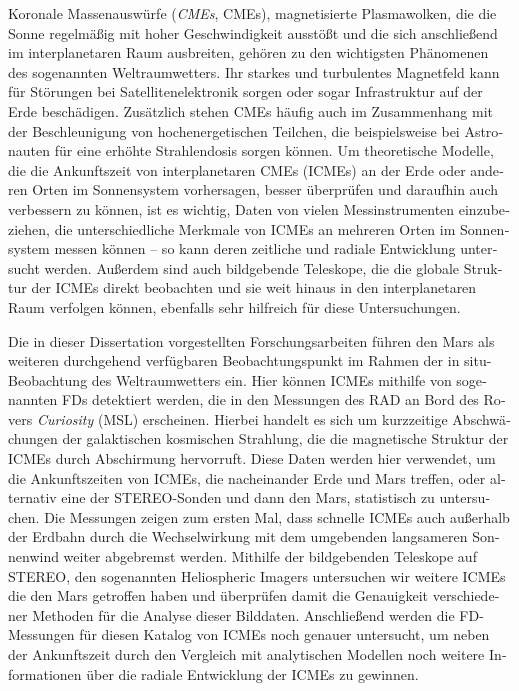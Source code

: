 \begin{otherlanguage}{ngerman}
Koronale Massenauswürfe (\textit{\aclp{CME}}, \acp{CME}), magnetisierte Plasmawolken, die die Sonne regelmäßig mit hoher Geschwindigkeit ausstößt und die sich anschließend im interplanetaren Raum ausbreiten, gehören zu den wichtigsten Phänomenen des sogenannten Weltraumwetters.
Ihr starkes und turbulentes Magnetfeld kann für Störungen bei Satellitenelektronik sorgen oder sogar Infrastruktur auf der Erde beschädigen. Zusätzlich stehen \acp{CME} häufig auch im Zusammenhang mit der Beschleunigung von hochenergetischen Teilchen, die beispielsweise bei Astronauten für eine erhöhte Strahlendosis sorgen können.
Um theoretische Modelle, die die Ankunftszeit von interplanetaren \acp{CME} (\acsp{ICME}) an der Erde oder anderen Orten im Sonnensystem vorhersagen, besser überprüfen und daraufhin auch verbessern zu können, ist es wichtig, Daten von vielen Messinstrumenten einzubeziehen, die unterschiedliche Merkmale von \acp{ICME} an mehreren Orten im Sonnensystem messen können -- so kann deren zeitliche und radiale Entwicklung untersucht werden. Außerdem sind auch bildgebende Teleskope, die die globale Struktur der \acp{ICME} direkt beobachten und sie weit hinaus in den interplanetaren Raum verfolgen können, ebenfalls sehr hilfreich für diese Untersuchungen.

Die in dieser Dissertation vorgestellten Forschungsarbeiten führen den Mars als weiteren durchgehend verfügbaren Beobachtungspunkt im Rahmen der in situ-Beobachtung des Weltraumwetters ein. Hier können \acp{ICME} mithilfe von sogenannten \aclp{FD} detektiert werden, die in den Messungen des \ac{RAD} an Bord des Rovers \textit{Curiosity} (\acl{MSL}) erscheinen. Hierbei handelt es sich um kurzzeitige Abschwächungen der galaktischen kosmischen Strahlung, die die magnetische Struktur der \acp{ICME} durch Abschirmung hervorruft.
Diese Daten werden hier verwendet, um die Ankunftszeiten von \acp{ICME}, die nacheinander Erde und Mars treffen, oder alternativ eine der \acs{STEREO}-Sonden und dann den Mars, statistisch zu untersuchen. %
Die Messungen zeigen zum ersten Mal, dass schnelle \acp{ICME} auch außerhalb der Erdbahn durch die Wechselwirkung mit dem umgebenden langsameren Sonnenwind weiter abgebremst werden.
Mithilfe der bildgebenden Teleskope auf \acs{STEREO}, den sogenannten Heliospheric Imagers untersuchen wir weitere \acp{ICME} die den Mars getroffen haben und überprüfen damit die Genauigkeit verschiedener Methoden für die Analyse dieser Bilddaten.
Anschließend werden die \acl{FD}-Messungen für diesen Katalog von \acp{ICME} noch genauer untersucht, um neben der Ankunftszeit durch den Vergleich mit analytischen Modellen noch weitere Informationen über die radiale Entwicklung der \acp{ICME} zu gewinnen.


\end{otherlanguage}
